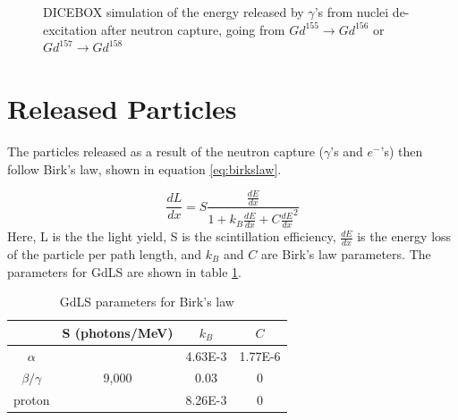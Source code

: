 \begin{figure}[!htbp]
    \centering
    \caption{DICEBOX simulation of the energy released by $\gamma$'s from nuclei de-excitation after neutron capture, going from $Gd^{155} \xrightarrow{} Gd^{156}$ or $Gd^{157} \xrightarrow{} Gd^{158}$}
    \label{fig:Gd_capture_resulting_gamma_spectrum}
\end{figure}




\section{Released Particles}
\par
The particles released as a result of the neutron capture ($\gamma$'s and $e^{-}$'s) then follow Birk's law, shown in equation \ref{eq:birkslaw}.

\begin{equation}
    \frac{dL}{dx} = S \frac{\frac{dE}{dx}}{1 + k_{B}\frac{dE}{dx} + C\frac{dE}{dx}^2}
    \label{eq:birkslaw}
\end{equation}
Here, L is the the light yield, S is the scintillation efficiency, $\frac{dE}{dx}$ is the energy loss of the particle per path length, and $k_{B}$ and $C$ are Birk's law parameters.
The parameters for GdLS are shown in table \ref{tab:Birks_law_parameters}.


\begin{table}[!htbp]
    \centering
    \begin{tabular}{c | c | c | c }
                   & S (photons/MeV) & $k_{B}$ & $C$ \\ \hline
    $\alpha$       &                 & 4.63E-3 & 1.77E-6 \\
    $\beta/\gamma$ & 9,000           & 0.03    & 0 \\ 
    proton         &                 & 8.26E-3 & 0
    \end{tabular}
    \caption{GdLS parameters for Birk's law}
    \label{tab:Birks_law_parameters}
\end{table} 

